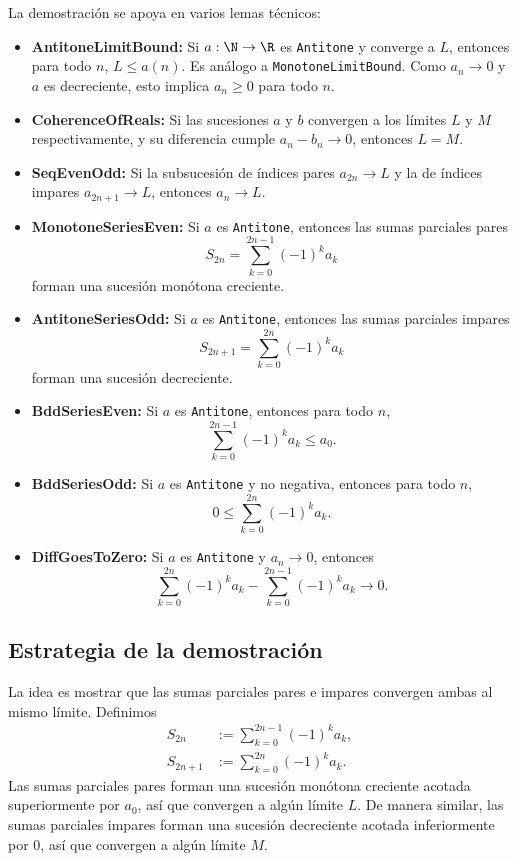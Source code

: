 La demostración se apoya en varios lemas técnicos:
\begin{itemize}
  \item \textbf{AntitoneLimitBound:} Si $a : \N \to \R$ es \texttt{Antitone} y converge a $L$, entonces para todo $n$, $L \le a(n)$. Es análogo a \texttt{MonotoneLimitBound}. Como $a_n \to 0$ y $a$ es decreciente, esto implica $a_n \ge 0$ para todo $n$.
  \item \textbf{CoherenceOfReals:} Si las sucesiones $a$ y $b$ convergen a los límites $L$ y $M$ respectivamente, y su diferencia cumple $a_n - b_n \to 0$, entonces $L = M$.
  \item \textbf{SeqEvenOdd:} Si la subsucesión de índices pares $a_{2n} \to L$ y la de índices impares $a_{2n+1} \to L$, entonces $a_n \to L$.
  \item \textbf{MonotoneSeriesEven:} Si $a$ es \texttt{Antitone}, entonces las sumas parciales pares
  \[
    S_{2n} = \sum_{k=0}^{2n-1} (-1)^k a_k
  \]
  forman una sucesión monótona creciente.
  \item \textbf{AntitoneSeriesOdd:} Si $a$ es \texttt{Antitone}, entonces las sumas parciales impares
  \[
    S_{2n+1} = \sum_{k=0}^{2n} (-1)^k a_k
  \]
  forman una sucesión decreciente.
  \item \textbf{BddSeriesEven:} Si $a$ es \texttt{Antitone}, entonces para todo $n$,
  \[
    \sum_{k=0}^{2n-1} (-1)^k a_k \le a_0 .
  \]
  \item \textbf{BddSeriesOdd:} Si $a$ es \texttt{Antitone} y no negativa, entonces para todo $n$,
  \[
    0 \le \sum_{k=0}^{2n} (-1)^k a_k .
  \]
  \item \textbf{DiffGoesToZero:} Si $a$ es \texttt{Antitone} y $a_n \to 0$, entonces
  \[
    \sum_{k=0}^{2n} (-1)^k a_k - \sum_{k=0}^{2n-1} (-1)^k a_k \to 0 .
  \]
\end{itemize}

\subsection{Estrategia de la demostración}

La idea es mostrar que las sumas parciales pares e impares convergen ambas al mismo límite. Definimos
\begin{align*}
  S_{2n} &:= \sum_{k=0}^{2n-1} (-1)^k a_k,\\
  S_{2n+1} &:= \sum_{k=0}^{2n} (-1)^k a_k .
\end{align*}
Las sumas parciales pares forman una sucesión monótona creciente acotada superiormente por $a_0$, así que convergen a algún límite $L$. De manera similar, las sumas parciales impares forman una sucesión decreciente acotada inferiormente por $0$, así que convergen a algún límite $M$.

